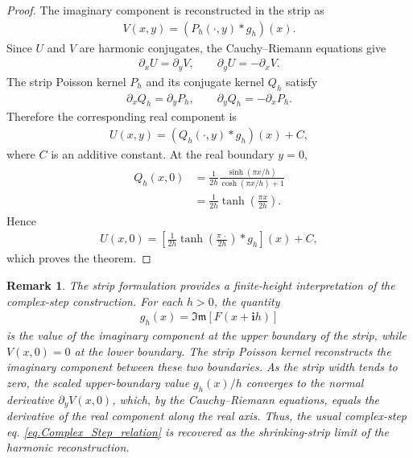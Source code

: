 \documentclass[11pt]{article}
\newtheorem{remark}[theorem]{Remark}
\newcommand{\imag}{\textbf{i}}
\newcommand{\ImagPart}{\mathfrak{Im}}
\begin{document}
\begin{proof}
	The imaginary component is reconstructed in the strip as
	\begin{align*}
		V(x,y)
		=
		\left(P_h(\cdot,y)*g_h\right)(x).
	\end{align*}
	Since \(U\) and \(V\) are harmonic conjugates, the
	Cauchy--Riemann equations give
	\begin{align*}
		\partial_xU=\partial_yV,
		\qquad
		\partial_yU=-\partial_xV.
	\end{align*}
	The strip Poisson kernel \(P_h\) and its conjugate kernel \(Q_h\)
	satisfy
	\begin{align*}
		\partial_xQ_h=\partial_yP_h,
		\qquad
		\partial_yQ_h=-\partial_xP_h.
	\end{align*}
	Therefore the corresponding real component is
	\begin{align*}
		U(x,y)
		=
		\left(Q_h(\cdot,y)*g_h\right)(x)+C,
	\end{align*}
	where \(C\) is an additive constant. At the real boundary \(y=0\),
	\begin{align*}
		\begin{aligned}
			Q_h(x,0)
			&=
			\frac{1}{2h}
			\frac{\sinh(\pi x/h)}
			{\cosh(\pi x/h)+1}
			\\
			&=
			\frac{1}{2h}
			\tanh\left(\frac{\pi x}{2h}\right).
		\end{aligned}
	\end{align*}
	Hence
	\begin{align*}
		U(x,0)
		=
		\left[
		\frac{1}{2h}
		\tanh\left(
		\frac{\pi\,\cdot}{2h}
		\right)
		*g_h
		\right](x)+C,
	\end{align*}
	which proves the theorem.
\end{proof}

\begin{remark}
	The strip formulation provides a finite-height interpretation of the
	complex-step construction. For each \(h>0\), the quantity
	\begin{align*}
		g_h(x)
		=
		\ImagPart\!\left[F(x+\imag h)\right]
	\end{align*}
	is the value of the imaginary component at the upper boundary of the
	strip, while \(V(x,0)=0\) at the lower boundary. The strip Poisson
	kernel reconstructs the imaginary component between these two
	boundaries. As the strip width tends to zero, the scaled upper-boundary
	value \(g_h(x)/h\) converges to the normal derivative
	\(\partial_yV(x,0)\), which, by the Cauchy--Riemann equations, equals
	the derivative of the real component along the real axis. Thus, the
	usual complex-step eq. \eqref{eq.Complex_Step_relation} is recovered as the shrinking-strip limit
	of the harmonic reconstruction.
\end{remark}
\end{document}
